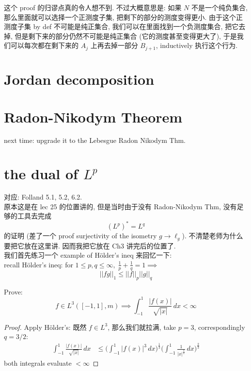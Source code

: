 \documentclass[lang=cn,11pt]{elegantbook}
\begin{document}
\begin{remark}
   这个 proof 的归谬点真的令人想不到. 不过大概意思是: 如果 $N$ 不是一个纯负集合, 那么里面就可以选择一个正测度子集, 把剩下的部分的测度变得更小. 
   由于这个正测度子集 by def 不可能是纯正集合,  我们可以在里面找到一个负测度集合, 把它去掉, 但是剩下来的部分仍然不可能是纯正集合 (它的测度甚至变得更大了), 于是我们可以每次都在剩下来的 $A_{j}$ 上再去掉一部分 $B_{j+1}$, inductively 执行这个行为.
\end{remark}



\chapter{Jordan decomposition}








\chapter{Radon-Nikodym Theorem}







next time: upgrade it to the Lebesgue Radon Nikodym Thm.













\chapter{the dual of $L^p$}
对应: Folland 5.1, 5.2, 6.2.\\
原本这是在 lec 25 的位置讲的, 但是当时由于没有 Radon-Nikodym Thm, 没有足够的工具去完成 \[
(L^p)^* = L^q
\]
的证明 (差了一个 proof surjectivity of the isometry $g \to \ell_g$). 不清楚老师为什么要把它放在这里讲. 因而我把它放在 Ch3 讲完后的位置了.\\
我们首先练习一个 example of Hölder's ineq 来回忆一下:\\
recall Hölder's ineq: for $1\leq p,q\leq\infty,\; \frac{1}{p}+\frac{1}{q} = 1\implies$ \[
||fg||_1 \leq ||f||_p ||g||_q
\]
\begin{example}
Prove:\[
    f \in L^3 ([-1,1],m)\implies \int_{-1}^1 \frac{|f(x)|}{\sqrt{|x|}} \,dx < \infty
    \]
\begin{proof}
    Apply Hölder's: 既然 $f\in L^3$, 那么我们就拉满, take $p=3$, correspondingly $ q=3/2$:\begin{align}
        \int_{-1}^1 \frac{|f(x)|}{\sqrt{|x|}} \,dx   &\leq \bigg(\int_{-1}^1 |f(x)|^3\, dx\bigg)^\frac{1}{3} \bigg(\int_{-1}^1  \frac{1}{|x|^{\frac{3}{4}}} \,dx    \bigg)^\frac{2}{3}
    \end{align} both integrals evaluate $<\infty$
\end{proof}
\end{example}
\end{document}
